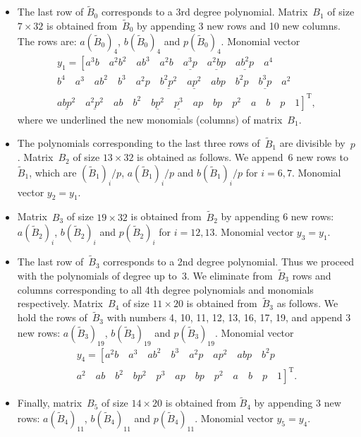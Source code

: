 \documentclass[reqno]{amsart}
\theoremstyle{plain}
\begin{document}
\begin{itemize}
\item The last row of $\tilde B_0$ corresponds to a 3rd degree polynomial. Matrix~$B_1$ of size $7\times 32$ is obtained from~$\tilde B_0$ by appending 3 new rows and 10 new columns. The rows are: $a(\tilde B_0)_4$, $b(\tilde B_0)_4$ and $p(\tilde B_0)_4$. Monomial vector
    \begin{multline}
    y_1 = \left[a^3b \quad a^2b^2 \quad ab^3 \quad a^2b \quad \underline{a^3p} \quad \underline{a^2bp} \quad \underline{ab^2p} \quad a^4 \right.\\ \left. b^4 \quad a^3 \quad ab^2 \quad b^3 \quad a^2p \quad \underline{b^2p^2} \quad \underline{ap^2} \quad abp \quad b^2p \quad \underline{b^3p} \quad a^2 \right.\\ \left. \underline{abp^2} \quad \underline{a^2p^2} \quad ab \quad b^2 \quad \underline{bp^2} \quad \underline{p^3} \quad ap \quad bp \quad p^2 \quad a \quad b \quad p \quad 1\right]^{\mathrm T},
    \end{multline}
    where we underlined the new monomials (columns) of matrix~$B_1$.

\item The polynomials corresponding to the last three rows of~$\tilde B_1$ are divisible by~$p$. Matrix~$B_2$ of size $13\times 32$ is obtained as follows. We append~6 new rows to~$\tilde B_1$, which are $(\tilde B_1)_i/p$, $a(\tilde B_1)_i/p$ and $b(\tilde B_1)_i/p$ for $i = 6, 7$. Monomial vector $y_2 = y_1$.

\item Matrix~$B_3$ of size $19\times 32$ is obtained from~$\tilde B_2$ by appending 6 new rows: $a(\tilde B_2)_i$, $b(\tilde B_2)_i$ and $p(\tilde B_2)_i$ for $i = 12, 13$. Monomial vector $y_3 = y_1$.

\item The last row of~$\tilde B_3$ corresponds to a 2nd degree polynomial. Thus we proceed with the polynomials of degree up to~$3$. We eliminate from~$\tilde B_3$ rows and columns corresponding to all 4th degree polynomials and monomials respectively. Matrix~$B_4$ of size $11\times 20$ is obtained from~$\tilde B_3$ as follows. We hold the rows of~$\tilde B_3$ with numbers 4, 10, 11, 12, 13, 16, 17, 19, and append 3 new rows: $a(\tilde B_3)_{19}$, $b(\tilde B_3)_{19}$ and $p(\tilde B_3)_{19}$. Monomial vector
    \begin{multline}
    y_4 = \left[a^2b \quad a^3 \quad ab^2 \quad b^3 \quad a^2p \quad ap^2 \quad abp \quad b^2p \right.\\ \left. a^2 \quad ab \quad b^2 \quad bp^2 \quad p^3 \quad ap \quad bp \quad p^2 \quad a \quad b \quad p \quad 1\right]^{\mathrm T}.
    \end{multline}

\item Finally, matrix~$B_5$ of size $14\times 20$ is obtained from $\tilde B_4$ by appending 3 new rows: $a(\tilde B_4)_{11}$, $b(\tilde B_4)_{11}$ and $p(\tilde B_4)_{11}$. Monomial vector $y_5 = y_4$.
\end{itemize}
\end{document}
